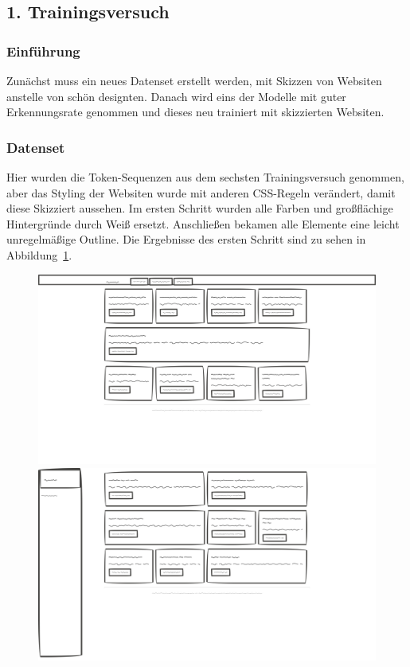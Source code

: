 \documentclass[pdftex,a4paper,halfparskip, article]{scrartcl}
\begin{document}
\subsection{1. Trainingsversuch}

\subsubsection*{Einführung}

Zunächst muss ein neues Datenset erstellt werden, mit Skizzen von Websiten anstelle von schön designten. Danach wird eins der Modelle mit guter Erkennungsrate genommen und dieses neu trainiert mit skizzierten Websiten.

\subsubsection*{Datenset}

Hier wurden die Token-Sequenzen aus dem sechsten Trainingsversuch genommen, aber das Styling der Websiten wurde mit anderen CSS-Regeln verändert, damit diese Skizziert aussehen. Im ersten Schritt wurden alle Farben und großflächige Hintergründe durch Weiß ersetzt. Anschließen bekamen alle Elemente eine leicht unregelmäßige Outline. Die Ergebnisse des ersten Schritt sind zu sehen in Abbildung~\ref{fig:skizzen}.

\begin{figure}
\centering
\begin{minipage}{.5\textwidth}
  \centering
  \includegraphics[width=0.8\linewidth]{skizze_1}
\end{minipage}%
\begin{minipage}{.5\textwidth}
  \centering
  \includegraphics[width=0.8\linewidth]{skizze_2}
\end{minipage}
  \label{fig:skizzen}
\end{figure}
\end{document}
